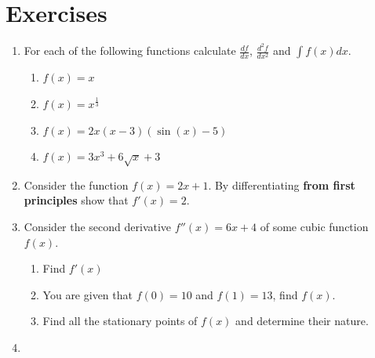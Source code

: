 \section{Exercises}
\label{\detokenize{tools-for-mathematics/03-calculus/exercises/main:exercises}}\label{\detokenize{tools-for-mathematics/03-calculus/exercises/main::doc}}
\begin{enumerate}

\item 

For each of the following functions calculate \(\frac{df}{dx}\), \(\frac{d^2f}{dx^2}\) and \(\int f(x) dx\).
\begin{enumerate}

\item 

\(f(x) = x\)

\item 

\(f(x) = x ^{\frac{1}{3}}\)

\item 

\(f(x) = 2 x (x - 3) (\sin(x) - 5)\)

\item 

\(f(x) = 3  x ^ 3 + 6 \sqrt{x} + 3\)

\end{enumerate}

\item 

Consider the function \(f(x)=2x+1\). By differentiating \textbf{from first principles} show that \(f'(x)=2\).

\item 

Consider the second derivative \(f''(x)=6x+4\) of some cubic function \(f(x)\).
\begin{enumerate}

\item 

Find \(f'(x)\)

\item 

You are given that \(f(0)=10\) and \(f(1)=13\), find \(f(x)\).

\item 

Find all the stationary points of \(f(x)\) and determine their nature.

\end{enumerate}

\item 


\end{enumerate}
